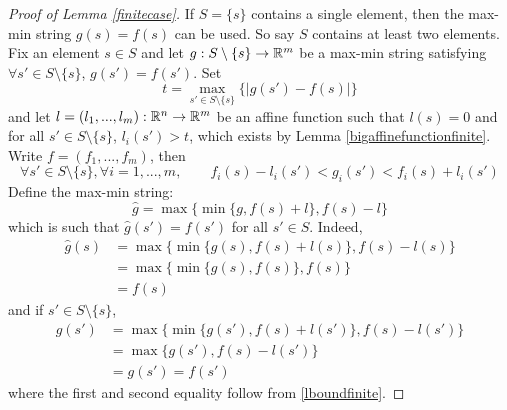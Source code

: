 %
\begin{proof}[Proof of Lemma \ref{finitecase}]
If $S = \lbrace s \rbrace$ contains a single element, then the max-min string $g(s) = f(s)$ can be used. So say $S$ contains at least two elements. Fix an element $s \in S$ and let $g: S\setminus\lbrace s \rbrace \to \mathbb{R}^m$ be a max-min string satisfying $\forall s' \in S\setminus\lbrace s\rbrace$, $g(s') = f(s')$. Set 
\[t = \operatorname{max}_{s' \in S \setminus \lbrace s \rbrace}\lbrace |g(s') - f(s)|\rbrace\]
and let $l = (l_1,...,l_m): \mathbb{R}^n \to \mathbb{R}^m$ be an affine function such that $l(s) = 0$ and for all $s' \in S \setminus \lbrace s \rbrace$, $l_i(s') > t$, which exists by Lemma \ref{bigaffinefunctionfinite}. Write $f = (f_1,...,f_m)$, then 
\begin{equation}
\label{lboundfinite}
\forall s' \in S\setminus\lbrace s \rbrace,\forall i = 1,...,m,\qquad f_i(s) - l_i(s') < g_i(s') < f_i(s) + l_i(s')
\end{equation}
Define the max-min string:
\[\hat{g} = \operatorname{max}\lbrace \operatorname{min}\lbrace g, f(s) + l\rbrace, f(s) - l\rbrace\]
which is such that $\hat{g}(s') = f(s')$ for all $s' \in S$. Indeed,
\begin{align*}
    \hat{g}(s) &= \operatorname{max}\lbrace \operatorname{min}\lbrace g(s), f(s) + l(s)\rbrace, f(s) - l(s)\rbrace\\
    &= \operatorname{max}\lbrace \operatorname{min}\lbrace g(s), f(s)\rbrace, f(s)\rbrace\\
    &= f(s)
\end{align*}
and if $s' \in S\setminus \lbrace s \rbrace$,
\begin{align*}
    \hat{g}(s') &= \operatorname{max}\lbrace \operatorname{min}\lbrace g(s'), f(s) + l(s')\rbrace, f(s) - l(s')\rbrace\\
    &= \operatorname{max}\lbrace g(s'), f(s) - l(s')\rbrace\\
    &= g(s') = f(s')
\end{align*}
where the first and second equality follow from \ref{lboundfinite}.
\end{proof}